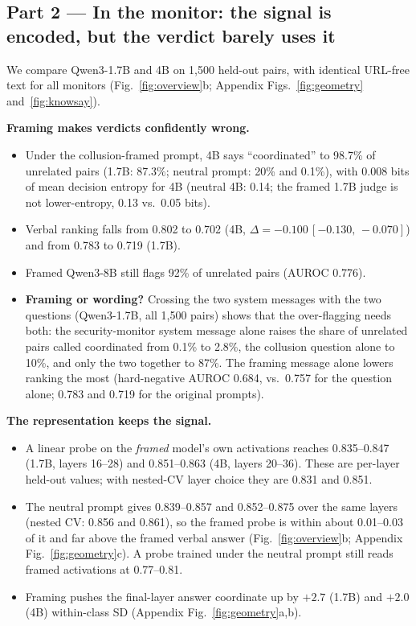 \documentclass[10.5pt]{article}
\newcommand{\ci}[2]{\,[#1,\,#2]}
\begin{document}
\subsection{Part 2 --- In the monitor: the signal is encoded, but the verdict barely uses it}
\label{sec:p2}
We compare Qwen3-1.7B and 4B on 1,500 held-out pairs, with identical URL-free text for all monitors (Fig.~\ref{fig:overview}b; Appendix Figs.~\ref{fig:geometry} and~\ref{fig:knowsay}).

\textbf{Framing makes verdicts confidently wrong.}
\begin{itemize}
\item Under the collusion-framed prompt, 4B says ``coordinated'' to 98.7\% of unrelated pairs (1.7B: 87.3\%; neutral prompt: 20\% and 0.1\%), with 0.008 bits of mean decision entropy for 4B (neutral 4B: 0.14; the framed 1.7B judge is not lower-entropy, 0.13 vs.\ 0.05 bits).
\item Verbal ranking falls from 0.802 to 0.702 (4B, $\Delta=-0.100\ci{-0.130}{-0.070}$) and from 0.783 to 0.719 (1.7B).
\item Framed Qwen3-8B still flags 92\% of unrelated pairs (AUROC 0.776).
\item \textbf{Framing or wording?} Crossing the two system messages with the two questions (Qwen3-1.7B, all 1,500 pairs) shows that the over-flagging needs both: the security-monitor system message alone raises the share of unrelated pairs called coordinated from 0.1\% to 2.8\%, the collusion question alone to 10\%, and only the two together to 87\%. The framing message alone lowers ranking the most (hard-negative AUROC 0.684, vs.\ 0.757 for the question alone; 0.783 and 0.719 for the original prompts).
\end{itemize}

\textbf{The representation keeps the signal.}
\begin{itemize}
\item A linear probe on the \emph{framed} model's own activations reaches 0.835--0.847 (1.7B, layers 16--28) and 0.851--0.863 (4B, layers 20--36). These are per-layer held-out values; with nested-CV layer choice they are 0.831 and 0.851.
\item The neutral prompt gives 0.839--0.857 and 0.852--0.875 over the same layers (nested CV: 0.856 and 0.861), so the framed probe is within about 0.01--0.03 of it and far above the framed verbal answer (Fig.~\ref{fig:overview}b; Appendix Fig.~\ref{fig:geometry}c). A probe trained under the neutral prompt still reads framed activations at 0.77--0.81.
\item Framing pushes the final-layer answer coordinate up by $+2.7$ (1.7B) and $+2.0$ (4B) within-class SD (Appendix Fig.~\ref{fig:geometry}a,b).
\end{itemize}
\end{document}
